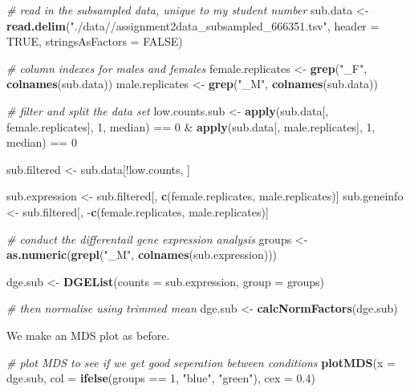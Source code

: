 \documentclass[]{article}
\newenvironment{Shaded}{\begin{snugshade}}{\end{snugshade}}
\newcommand{\KeywordTok}[1]{\textcolor[rgb]{0.13,0.29,0.53}{\textbf{{#1}}}}
\newcommand{\DataTypeTok}[1]{\textcolor[rgb]{0.13,0.29,0.53}{{#1}}}
\newcommand{\DecValTok}[1]{\textcolor[rgb]{0.00,0.00,0.81}{{#1}}}
\newcommand{\FloatTok}[1]{\textcolor[rgb]{0.00,0.00,0.81}{{#1}}}
\newcommand{\StringTok}[1]{\textcolor[rgb]{0.31,0.60,0.02}{{#1}}}
\newcommand{\CommentTok}[1]{\textcolor[rgb]{0.56,0.35,0.01}{\textit{{#1}}}}
\newcommand{\OtherTok}[1]{\textcolor[rgb]{0.56,0.35,0.01}{{#1}}}
\newcommand{\NormalTok}[1]{{#1}}
\begin{document}
\begin{Shaded}
\begin{Highlighting}[]
\CommentTok{# read in the subsampled data, unique to my student number}
\NormalTok{sub.data <-}\StringTok{ }\KeywordTok{read.delim}\NormalTok{(}\StringTok{"./data//assignment2data_subsampled_666351.tsv"}\NormalTok{, }\DataTypeTok{header =} \OtherTok{TRUE}\NormalTok{, }
    \DataTypeTok{stringsAsFactors =} \OtherTok{FALSE}\NormalTok{)}

\CommentTok{# column indexes for males and females}
\NormalTok{female.replicates <-}\StringTok{ }\KeywordTok{grep}\NormalTok{(}\StringTok{"_F"}\NormalTok{, }\KeywordTok{colnames}\NormalTok{(sub.data))}
\NormalTok{male.replicates <-}\StringTok{ }\KeywordTok{grep}\NormalTok{(}\StringTok{"_M"}\NormalTok{, }\KeywordTok{colnames}\NormalTok{(sub.data))}

\CommentTok{# filter and split the data set}
\NormalTok{low.counts.sub <-}\StringTok{ }\KeywordTok{apply}\NormalTok{(sub.data[, female.replicates], }\DecValTok{1}\NormalTok{, median) ==}\StringTok{ }\DecValTok{0} \NormalTok{&}\StringTok{ }\KeywordTok{apply}\NormalTok{(sub.data[, }
    \NormalTok{male.replicates], }\DecValTok{1}\NormalTok{, median) ==}\StringTok{ }\DecValTok{0}

\NormalTok{sub.filtered <-}\StringTok{ }\NormalTok{sub.data[!low.counts, ]}

\NormalTok{sub.expression <-}\StringTok{ }\NormalTok{sub.filtered[, }\KeywordTok{c}\NormalTok{(female.replicates, male.replicates)]}
\NormalTok{sub.geneinfo <-}\StringTok{ }\NormalTok{sub.filtered[, -}\KeywordTok{c}\NormalTok{(female.replicates, male.replicates)]}

\CommentTok{# conduct the differentail gene expression analysis}
\NormalTok{groups <-}\StringTok{ }\KeywordTok{as.numeric}\NormalTok{(}\KeywordTok{grepl}\NormalTok{(}\StringTok{"_M"}\NormalTok{, }\KeywordTok{colnames}\NormalTok{(sub.expression)))}

\NormalTok{dge.sub <-}\StringTok{ }\KeywordTok{DGEList}\NormalTok{(}\DataTypeTok{counts =} \NormalTok{sub.expression, }\DataTypeTok{group =} \NormalTok{groups)}

\CommentTok{# then normalise using trimmed mean}
\NormalTok{dge.sub <-}\StringTok{ }\KeywordTok{calcNormFactors}\NormalTok{(dge.sub)}
\end{Highlighting}
\end{Shaded}

We make an MDS plot as before.

\begin{Shaded}
\begin{Highlighting}[]
\CommentTok{# plot MDS to see if we get good seperation between conditions}
\KeywordTok{plotMDS}\NormalTok{(}\DataTypeTok{x =} \NormalTok{dge.sub, }\DataTypeTok{col =} \KeywordTok{ifelse}\NormalTok{(groups ==}\StringTok{ }\DecValTok{1}\NormalTok{, }\StringTok{"blue"}\NormalTok{, }\StringTok{"green"}\NormalTok{), }\DataTypeTok{cex =} \FloatTok{0.4}\NormalTok{)}
\end{Highlighting}
\end{Shaded}
\end{document}
